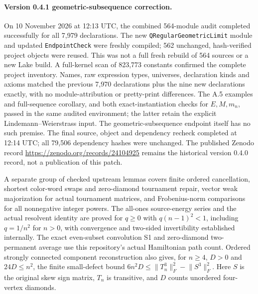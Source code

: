 \documentclass[11pt]{article}
\begin{document}
\paragraph{Version 0.4.1 geometric-subsequence correction.} On 10 November 2026 at 12:13 UTC, the combined 564-module audit completed successfully for all 7,979 declarations. The new \texttt{QRegularGeometricLimit} module and updated \texttt{EndpointCheck} were freshly compiled; 562 unchanged, hash-verified project objects were reused. This was not a full fresh rebuild of 564 sources or a new Lake build. A full-kernel scan of 823,773 constants confirmed the complete project inventory. Names, raw expression types, universes, declaration kinds and axioms matched the previous 7,970 declarations plus the nine new declarations exactly, with no module-attribution or pretty-print differences. The A.5 examples and full-sequence corollary, and both exact-instantiation checks for $E,M,m_n$, passed in the same audited environment; the latter retain the explicit Lindemann--Weierstrass input. The geometric-subsequence endpoint itself has no such premise. The final source, object and dependency recheck completed at 12:14 UTC; all 79,506 dependency hashes were unchanged. The published Zenodo record \url{https://zenodo.org/records/24104925} remains the historical version 0.4.0 record, not a publication of this patch.

A separate group of checked upstream lemmas covers finite ordered cancellation, shortest color-word swaps and zero-diamond tournament repair, vector weak majorization for actual tournament matrices, and Frobenius-norm comparisons for all nonnegative integer powers. The all-ones source-energy series and the actual resolvent identity are proved for $q\ge0$ with $q(n-1)^2<1$, including $q=1/n^2$ for $n>0$, with convergence and two-sided invertibility established internally. The exact even-subset convolution S1 and zero-diamond two-permanent average use this repository's actual Hamiltonian path count. Ordered strongly connected component reconstruction also gives, for $n\ge4$, $D>0$ and $24D\le n^2$, the finite small-defect bound $6n^2D\le\lVert T_n^3\rVert_F^2-\lVert S^3\rVert_F^2$. Here $S$ is the original skew sign matrix, $T_n$ is transitive, and $D$ counts unordered four-vertex diamonds.
\end{document}
